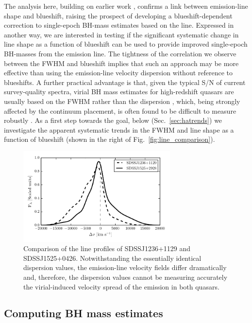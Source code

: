 The analysis here, building on earlier work \citep[including][]{shen12, sulentic07}, confirms a link between  emission-line shape and blueshift, raising the prospect of developing a blueshift-dependent correction to single-epoch BH-mass estimates based on the  line. 
Expressed in another way, we are interested in testing if the significant systematic change in line shape as a function of  blueshift can be used to provide improved single-epoch BH-masses from the  emission line.  
The tightness of the correlation we observe between the  FWHM and blueshift implies that such an approach may be more effective than using the  emission-line velocity dispersion without reference to blueshifts.
A further practical advantage is that, given the typical S/N of current survey-quality spectra, virial BH mass estimates for high-redshift quasars are usually based on the FWHM rather than the dispersion \citep[e.g.][]{shen11}, which, being strongly affected by the continuum placement, is often found to be difficult to measure robustly \citep[e.g.][]{mejia-restrepo16}. 
As a first step towards the goal, below (Sec.~\ref{sec:hatrends}) we investigate the apparent systematic trends in the \ha FWHM and line shape as a function of  blueshift (shown in the right of Fig.~\ref{fig:line_comparison}).

\begin{figure}
	\includegraphics[width=8cm]{figures/chapter02/civ_comparison.pdf} 
    \caption{Comparison of the  line profiles of SDSSJ1236+1129 and SDSSJ1525+0426. Notwithstanding the essentially identical dispersion values, the emission-line velocity fields differ dramatically and, therefore, the dispersion values cannot be measuring accurately the virial-induced velocity spread of the  emission in both quasars. }
    \label{fig:civ_comparison}
\end{figure}

\subsection{Computing BH mass estimates}
\label{sec:nonvirialmass}

